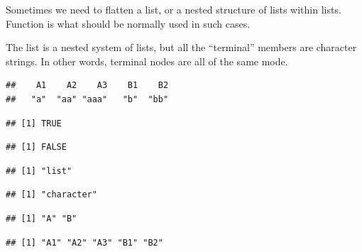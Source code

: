\documentclass[krantz2]{krantz}\usepackage{knitr}
\begin{document}
Sometimes we need to flatten a list, or a nested structure of lists within lists. Function  is what should be normally used in such cases.

The list  is a nested system of lists, but all the ``terminal'' members are character strings. In other words, terminal nodes are all of the same mode.

\begin{knitrout}\footnotesize
{}\color{fgcolor}\begin{kframe}
\begin{alltt}
 \hlkwb{<-} 
\end{alltt}
\begin{verbatim}
##    A1    A2    A3    B1    B2 
##   "a"  "aa" "aaa"   "b"  "bb"
\end{verbatim}
\begin{alltt}
\end{alltt}
\begin{verbatim}
## [1] TRUE
\end{verbatim}
\begin{alltt}
\end{alltt}
\begin{verbatim}
## [1] FALSE
\end{verbatim}
\begin{alltt}
\end{alltt}
\begin{verbatim}
## [1] "list"
\end{verbatim}
\begin{alltt}
\end{alltt}
\begin{verbatim}
## [1] "character"
\end{verbatim}
\begin{alltt}
\end{alltt}
\begin{verbatim}
## [1] "A" "B"
\end{verbatim}
\begin{alltt}
\end{alltt}
\begin{verbatim}
## [1] "A1" "A2" "A3" "B1" "B2"
\end{verbatim}
\end{kframe}
\end{knitrout}
\end{document}
